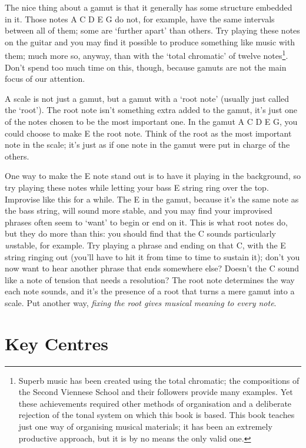 \documentclass[english]{./gbook}
\begin{document}
\begin{large}
The nice thing about a gamut is that it generally has some structure embedded in it. Those notes A C D E G do not, for example, have the same intervals between all of them; some are `further apart' than others. Try playing these notes on the guitar and you may find it possible to produce something like music with them; much more so, anyway, than with the `total chromatic' of twelve notes\footnote{Superb music has been created using the total chromatic; the compositions of the Second Viennese School and their followers provide many examples. Yet these achievements required other methods of organisation and a deliberate rejection of the tonal system on which this book is based. This book teaches just one way of organising musical materials; it has been an extremely productive approach, but it is by no means the only valid one.}. Don't spend too much time on this, though, because gamuts are not the main focus of our attention.

A scale is not just a gamut, but a gamut with a `root note' (usually just called the `root'). The root note isn't something extra added to the gamut, it's just one of the notes chosen to be the most important one. In the gamut A C D E G, you could choose to make E the root note. Think of the root as the most important note in the scale; it's just as if one note in the gamut were put in charge of the others. 

One way to make the E note stand out is to have it playing in the background, so try playing these notes while letting your bass E string ring over the top. Improvise like this for a while. The E in the gamut, because it's the same note as the bass string, will sound more stable, and you may find your improvised phrases often seem to `want' to begin or end on it. This is what root notes do, but they do more than this: you should find that the C sounds particularly \emph{un}stable, for example. Try playing a phrase and ending on that C, with the E string ringing out (you'll have to hit it from time to time to sustain it); don't you now want to hear another phrase that ends somewhere else? Doesn't the C sound like a note of tension that needs a resolution? The root note determines the way each note sounds, and it's the presence of a root that turns a mere gamut into a scale. Put another way, \emph{fixing the root gives musical meaning to every note}.

\section*{Key Centres}


\end{large}
\end{document}
